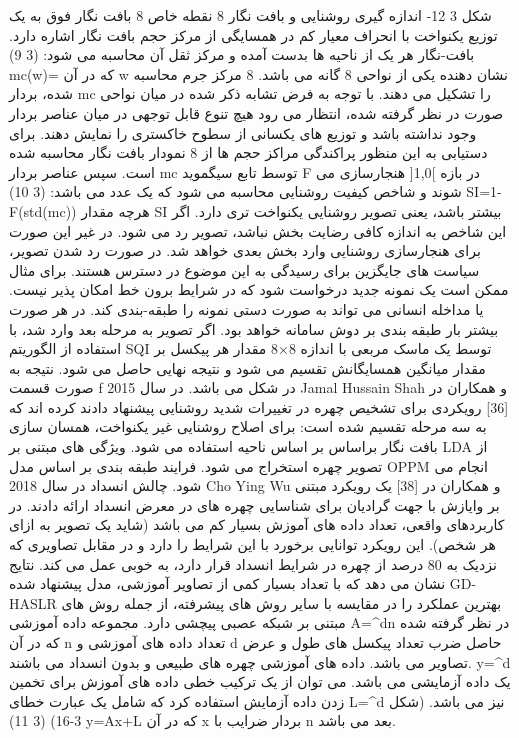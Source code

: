 شکل ‏3 12- اندازه گیری روشنایی و بافت نگار 8 نقطه خاص
8 بافت نگار فوق به یک توزیع یکنواخت با انحراف معیار کم در همسایگی از مرکز حجم بافت نگار اشاره دارد. بافت-نگار هر یک از ناحیه ها بدست آمده و مرکز ثقل آن محاسبه می شود:
(‏3 9)
mc\left(w\right)=	
که در آن w نشان دهنده یکی از نواحی 8 گانه می باشد. 8 مرکز جرم محاسبه شده، بردار mc را تشکیل می دهند. با توجه به فرض تشابه ذکر شده در میان نواحی صورت در نظر گرفته شده، انتظار می رود هیچ تنوع قابل توجهی در میان عناصر بردار وجود نداشته باشد و توزیع های یکسانی از سطوح خاکستری را نمایش دهند. برای دستیابی به این منظور پراکندگی مراکز حجم ها از 8 نمودار بافت نگار محاسبه شده است. سپس عناصر بردار mc توسط تابع سیگموید F در بازه ]1,0[ هنجارسازی می شوند و شاخص کیفیت روشنایی محاسبه می شود که یک عدد می باشد:
(‏3 10)
SI=1-F(std\left(mc\right))	
هرچه مقدار SI بیشتر باشد، یعنی تصویر روشنایی یکنواخت تری دارد. اگر این شاخص به اندازه کافی رضایت بخش نباشد، تصویر رد می شود. در غیر این صورت برای هنجارسازی روشنایی وارد بخش بعدی خواهد شد. در صورت رد شدن تصویر، سیاست های جایگزین برای رسیدگی به این موضوع در دسترس هستند. برای مثال ممکن است یک نمونه جدید درخواست شود که در شرایط برون خط امکان پذیر نیست. یا مداخله انسانی می تواند به صورت دستی نمونه را طبقه-بندی کند. در هر صورت بیشتر بار طبقه بندی بر دوش سامانه خواهد بود. اگر تصویر به مرحله بعد وارد شد، با استفاده از الگوریتم SQI توسط یک ماسک مربعی با اندازه 8×8 مقدار هر پیکسل بر مقدار میانگین همسایگانش تقسیم می شود و نتیجه نهایی حاصل می شود. نتیجه به صورت قسمت f در شکل  می باشد.
در سال 2015 Jamal Hussain Shah و همکاران در [36] رویکردی برای تشخیص چهره در تغییرات شدید روشنایی پیشنهاد دادند کرده اند که به سه مرحله تقسیم شده است:
	برای اصلاح روشنایی غیر یکنواخت، همسان سازی بافت نگار براساس بر اساس ناحیه استفاده می شود.
	ویژگی های مبتنی بر LDA از تصویر چهره استخراج  می شود.
	فرایند طبقه بندی بر اساس مدل OPPM انجام می شود.
	چالش انسداد
در سال 2018 Cho Ying Wu و همکاران در [38] یک رویکرد مبتنی بر وايازش  با جهت گرادیان برای شناسایی چهره های در معرض انسداد ارائه دادند. در کاربردهای واقعی، تعداد داده های آموزش بسیار کم می باشد (شاید یک تصویر به ازای هر شخص). این رویکرد توانایی برخورد با این شرایط را دارد و در مقابل تصاویری که نزدیک به 80 درصد از چهره در شرایط انسداد قرار دارد، به خوبی عمل می کند. نتایج نشان می دهد که با تعداد بسیار کمی از تصاویر آموزشی، مدل پیشنهاد شده GD-HASLR بهترین عملکرد را در مقایسه با سایر روش های پیشرفته، از جمله روش های مبتنی بر شبکه عصبی پیچشی دارد. 
مجموعه داده  آموزشی A=^{d\times n} در نظر گرفته شده که در آن n تعداد داده های آموزشی و d حاصل ضرب تعداد پیکسل های طول و عرض تصاویر می باشد. داده های آموزشی چهره های طبیعی و بدون انسداد می باشند. y=^d یک داده آزمایشی می باشد. می توان از یک ترکیب خطی داده های آموزش برای تخمین زدن داده آزمایش استفاده کرد که شامل یک عبارت خطای L=^d نیز می باشد. (شکل 3-16) 
(‏3 11)
y=Ax+L	
که در آن x بردار ضرایب با n بعد می باشد.
 
